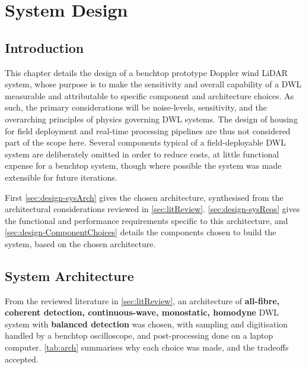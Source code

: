 \chapter{System Design}
 \label{sec:systemDesign}

\section{Introduction}
This chapter details the design of a benchtop prototype Doppler wind LiDAR system, whose purpose is to make the sensitivity and overall capability of a DWL measurable and attributable to specific component and architecture choices. As such, the primary considerations will be noise-levels, sensitivity, and the overarching principles of physics governing DWL systems. The design of housing for field deployment and real-time processing pipelines are thus not considered part of the scope here. Several components typical of a field-deployable DWL system are deliberately omitted in order to reduce costs, at little functional expense for a benchtop system, though where possible the system was made extensible for future iterations.

First \autoref{sec:design-sysArch} gives the chosen architecture, synthesised from the architectural considerations reviewed in \autoref{sec:litReview}. \autoref{sec:design-sysReqs} gives the functional and performance requirements specific to this architecture, and \autoref{sec:design-ComponentChoices} details the components chosen to build the system, based on the chosen architecture.

\section{System Architecture}
\label{sec:design-sysArch}
From the reviewed literature in \autoref{sec:litReview}, an architecture of \textbf{all-fibre, coherent detection, continuous-wave, monostatic, homodyne} DWL system with \textbf{balanced detection} was chosen, with sampling and digitisation handled by a benchtop oscilloscope, and post-processing done on a laptop computer. \autoref{tab:arch} summarises why each choice was made, and the tradeoffs accepted.

